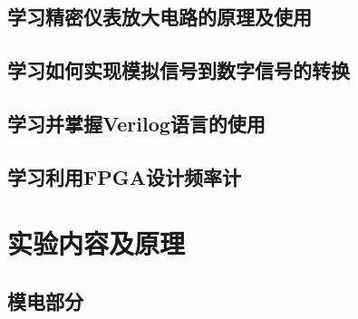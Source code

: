 \documentclass[12pt,a4paper]{ctexart}
\begin{document}
\subsection{学习精密仪表放大电路的原理及使用}
\subsection{学习如何实现模拟信号到数字信号的转换}
\subsection{学习并掌握Verilog语言的使用}
\subsection{学习利用FPGA设计频率计}


\section{实验内容及原理}

\subsection{模电部分}
\end{document}
